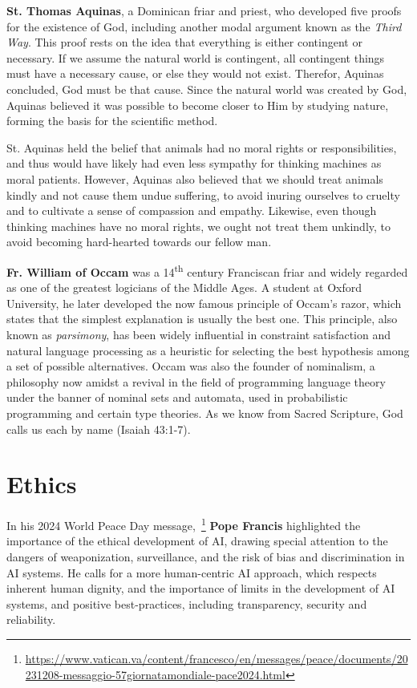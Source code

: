 \documentclass[sigplan,nonacm]{acmart}\settopmatter{printfolios=false,printccs=false,printacmref=false}
\begin{document}
  \textbf{St. Thomas Aquinas}, a Dominican friar and priest, who developed five proofs for the existence of God, including another modal argument known as the \textit{Third Way}. This proof rests on the idea that everything is either contingent or necessary. If we assume the natural world is contingent, all contingent things must have a necessary cause, or else they would not exist. Therefor, Aquinas concluded, God must be that cause. Since the natural world was created by God, Aquinas believed it was possible to become closer to Him by studying nature, forming the basis for the scientific method.

  St. Aquinas held the belief that animals had no moral rights or responsibilities, and thus would have likely had even less sympathy for thinking machines as moral patients. However, Aquinas also believed that we should treat animals kindly and not cause them undue suffering, to avoid inuring ourselves to cruelty and to cultivate a sense of compassion and empathy. Likewise, even though thinking machines have no moral rights, we ought not treat them unkindly, to avoid becoming hard-hearted towards our fellow man.

  \textbf{Fr. William of Occam} was a 14\textsuperscript{th} century Franciscan friar and widely regarded as one of the greatest logicians of the Middle Ages. A student at Oxford University, he later developed the now famous principle of Occam's razor, which states that the simplest explanation is usually the best one. This principle, also known as \textit{parsimony}, has been widely influential in constraint satisfaction and natural language processing as a heuristic for selecting the best hypothesis among a set of possible alternatives. Occam was also the founder of nominalism, a philosophy now amidst a revival in the field of programming language theory under the banner of nominal sets and automata, used in probabilistic programming and certain type theories. As we know from Sacred Scripture, God calls us each by name (Isaiah 43:1-7).

  \section{Ethics}

  In his 2024 World Peace Day message,~\footnote{\url{https://www.vatican.va/content/francesco/en/messages/peace/documents/20231208-messaggio-57giornatamondiale-pace2024.html}} \textbf{Pope Francis} highlighted the importance of the ethical development of AI, drawing special attention to the dangers of weaponization, surveillance, and the risk of bias and discrimination in AI systems. He calls for a more human-centric AI approach, which respects inherent human dignity, and the importance of limits in the development of AI systems, and positive best-practices, including transparency, security and reliability.
\end{document}
